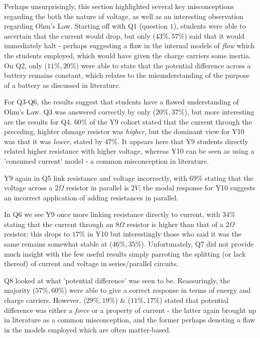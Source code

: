 \documentclass[a4paper,openany,nobib]{tufte-book}
\begin{document}
Perhaps unsurprisingly, this section highlighted several key misconceptions regarding the both the nature of voltage, as well as an interesting observation regarding Ohm's Law. 
Starting off with Q1 (question $1$), students were able to ascertain that the current would drop,
but only ($43\%,57\%$) said that it would immediately halt - perhaps suggesting a flaw in the internal models of \emph{flow} which the students employed, which would have given the charge carriers some inertia. 
On Q2, only ($11\%, 20\%$) were able to state that the potential difference across a battery remains constant, which relates to the misunderstanding of the purpose of a battery as discussed in literature\autocite{shipstone_children}. 

For Q3-Q6, the results suggest that students have a flawed understanding of Ohm's Law. Q3 was answered correctly by only ($20\%,37\%$), but more interesting are the results for Q4. $60\%$ of the Y9 cohort stated that the current through the preceding, highter ohmage resistor was \emph{higher}, but the dominant view for Y10 was that it was \emph{lower}, stated by $47\%$. It appears here that Y9 students directly related higher resistance with higher voltage, whereas Y10 can be seen as using a 'consumed current' model - a common misconception in literature.

Y9 again in Q5 link resistance and voltage incorrectly, with $69\%$ stating that the voltage across a $2\Omega$ resistor in parallel is $2V$; the modal response for Y10 suggests an incorrect application of adding resistances in parallel. 

In Q6 we see Y9 once more linking resistance directly to current, with $34\%$ stating that the current through an $8\Omega$ resistor is higher than that of a $2\Omega$ resistor; this drops to $17\%$ in Y10 but interestingly those who said it was the same remains somewhat stable at ($46\%,35\%$). Unfortunately, Q7 did not provide much insight with the few useful results simply parroting the splitting (or lack thereof) of current and voltage in series/parallel circuits.

Q8 looked at what 'potential difference' was seen to be. Reassuringly, the majority ($57\%,60\%$) were able to give a correct response in terms of energy and charge carriers. However, ($29\%,19\%$) \& ($11\%,17\%$) stated that potential difference was either a \emph{force} or a property of current - the latter again brought up in literature as a common misconception, and the former perhaps denoting a flaw in the models employed which are often matter-based.
\end{document}
